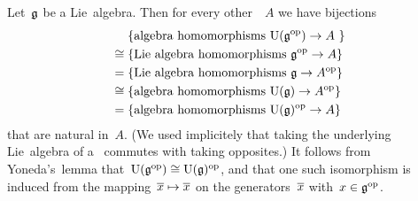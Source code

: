 \begin{example}
  \label{uea of opposite by first principles}
  Let~$\mathfrak{g}$ be a Lie~algebra.
  Then for every other~{\algebra{$\kf$}}~$A$ we have bijections
  \begin{align*}
    {}&
    \{ \text{algebra homomorphisms~$\operatorname{U}(\mathfrak{g}^{\mathrm{op}}) \to A$   } \}
    \\
    \cong{}&
    \{ \text{Lie~algebra homomorphisms~$\mathfrak{g}^{\mathrm{op}} \to A$} \}
    \\
    ={}&
    \{ \text{Lie~algebra homomorphisms~$\mathfrak{g} \to A^{\mathrm{op}}$} \}
    \\
    \cong{}&
    \{ \text{algebra homomorphisms~$\operatorname{U}(\mathfrak{g}) \to A^{\mathrm{op}}$} \}
    \\
    ={}&
    \{ \text{algebra homomorphisms~$\operatorname{U}(\mathfrak{g})^{\mathrm{op}} \to A$} \}
  \end{align*}
  that are natural in~$A$.
  (We used implicitely that taking the underlying Lie~algebra of a~{\algebra{$\kf$}} commutes with taking opposites.)
  It follows from Yoneda’s~lemma that~$\operatorname{U}(\mathfrak{g}^{\mathrm{op}}) \cong \operatorname{U}(\mathfrak{g})^{\mathrm{op}}$, and that one such isomorphism is induced from the mapping~$\overline{x} \mapsto \overline{x}$ on the generators~$\overline{x}$ with~$x \in \mathfrak{g}^{\mathrm{op}}$.
  

\end{example}
